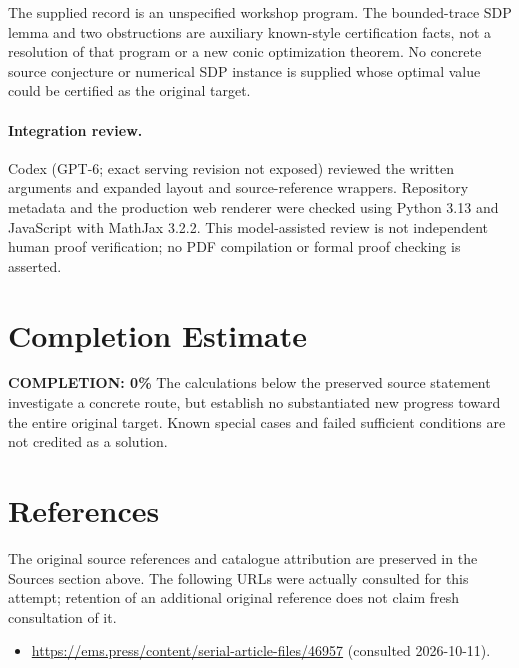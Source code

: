 \documentclass[11pt]{article}
\begin{document}
The supplied record is an unspecified workshop program. The bounded-trace SDP
lemma and two obstructions are auxiliary known-style certification facts, not a
resolution of that program or a new conic optimization theorem. No concrete
source conjecture or numerical SDP instance is supplied whose optimal value
could be certified as the original target.

\paragraph{Integration review.} Codex (GPT-6; exact serving revision not exposed) reviewed the written arguments and expanded layout and source-reference wrappers. Repository metadata and the production web renderer were checked using Python 3.13 and JavaScript with MathJax 3.2.2. This model-assisted review is not independent human proof verification; no PDF compilation or formal proof checking is asserted.

\section{Completion Estimate}
\noindent\textbf{COMPLETION: 0\%}
The calculations below the preserved source statement investigate a concrete route,
but establish no substantiated new progress toward the entire original target.
Known special cases and failed sufficient conditions are not credited as a solution.
\section{References}
The original source references and catalogue attribution are preserved in the
Sources section above. The following URLs were actually consulted for this attempt;
retention of an additional original reference does not claim fresh consultation of it.
\begin{itemize}
\item \url{https://ems.press/content/serial-article-files/46957} (consulted 2026-10-11). 
\end{itemize}
\end{document}
